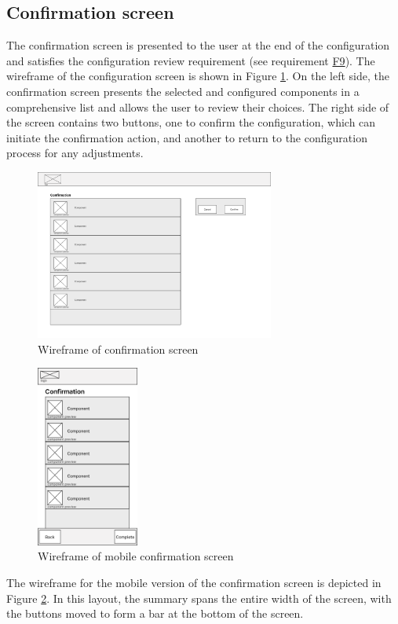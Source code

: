 \subsection{Confirmation screen}

The confirmation screen is presented to the user at the end of the configuration and satisfies the configuration review requirement (see requirement \hyperref[itm:F9]{F9}). The wireframe of the configuration screen is shown in Figure \ref{fig:wireframe-confirmation}. On the left side, the confirmation screen presents the selected and configured components in a comprehensive list and allows the user to review their choices. The right side of the screen contains two buttons, one to confirm the configuration, which can initiate the confirmation action, and another to return to the configuration process for any adjustments. 

\begin{figure}[hb]
\centering
\includegraphics[width=0.7\textwidth]{images/wireframe_confirmation_default.png}
\caption{Wireframe of confirmation screen}
\label{fig:wireframe-confirmation}
\end{figure}

\begin{figure}[h]
\centering
\includegraphics[width=0.3\textwidth]{images/wireframe_confirmation_mobile_default.png}
\caption{Wireframe of mobile confirmation screen}
\label{fig:wireframe-confirmation-mobile}
\end{figure}

The wireframe for the mobile version of the confirmation screen is depicted in Figure \ref{fig:wireframe-confirmation-mobile}. In this layout, the summary spans the entire width of the screen, with the buttons moved to form a bar at the bottom of the screen.

